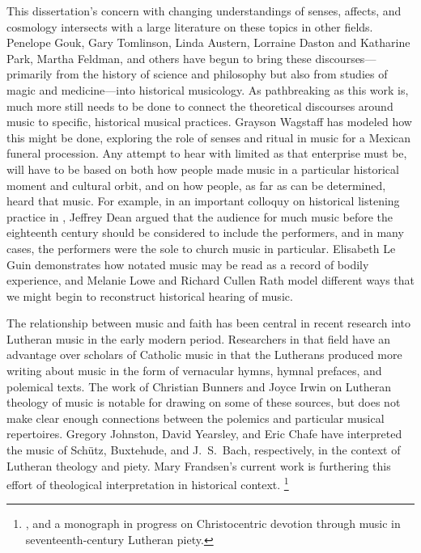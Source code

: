 This dissertation's concern with changing understandings of senses, affects, and cosmology intersects with a large literature on these topics in other fields. 
Penelope Gouk, Gary Tomlinson, Linda Austern, Lorraine Daston and Katharine Park, Martha Feldman, and others have begun to bring these discourses---primarily from the history of science and philosophy but also from studies of magic and medicine---into historical musicology.%
	\autocites{Gouk:MusicScienceMagic}{Gouk:Harmonics}{Gouk:Sciences}{Gouk:RepresentingEmotions}{Tomlinson:Magic}{Austern:Nature}{Daston:Wonders}{Feldman:Passions}
As pathbreaking as this work is, much more still needs to be done to connect the theoretical discourses around music to specific, historical musical practices. 
Grayson Wagstaff has modeled how this might be done, exploring the role of senses and ritual in music for a Mexican funeral procession.%
	\autocite{Wagstaff:Processions}	
Any attempt to hear with  limited as that enterprise must be, will have to be based on both how people made music in a particular historical moment and cultural orbit, and on how people, as far as can be determined, heard that music.%
	\autocite{Burstyn:PeriodEar}
For example, in an important colloquy on historical listening practice in , Jeffrey Dean argued that the audience for much music before the eighteenth century should be considered to include the performers, and in many cases, the performers were the sole  to church music in particular.%
	\autocite{Dean:ListeningPolyphony}
Elisabeth Le Guin demonstrates how notated music may be read as a record of bodily experience, and Melanie Lowe and Richard Cullen Rath model different ways that we might begin to reconstruct historical hearing of music.
	\autocites{LeGuin:BoccheriniBody}{Lowe:PleasureSymphony}{Rath:EarlyAmerica}

The relationship between music and faith has been central in recent research into Lutheran music in the early modern period.
Researchers in that field have an advantage over scholars of Catholic music in that the Lutherans produced more writing about music in the form of vernacular hymns, hymnal prefaces, and polemical texts.
The work of Christian Bunners and Joyce Irwin on Lutheran theology of music is notable for drawing on some of these sources, but does not make clear enough connections between the polemics and particular musical repertoires.%
	\autocites{Bunners:Kirchenmusik}{Bunners:Singende}{Irwin:VoiceHeart}
Gregory Johnston, David Yearsley, and Eric Chafe have interpreted the music of Schütz, Buxtehude, and J.~S.~Bach, respectively, in the context of Lutheran theology and piety.%
	\autocites{Johnston:Rhetorical}{Yearsley:Buxtehude}{Yearsley:BachThron}{Chafe:Tonal}
Mary Frandsen's current work is furthering this effort of theological interpretation in historical context.%
	\footnote{%
	\autocite{Frandsen:Crossing}, and a monograph in progress on Christocentric devotion through music in seventeenth-century Lutheran piety.
	}

